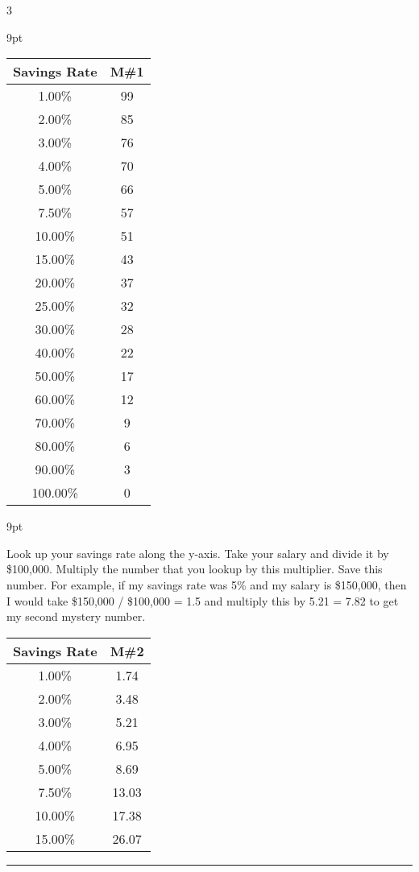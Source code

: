\documentclass[landscape]{article}
\newcommand{\myline}{\vspace{4pt}\hrule  \vspace{4pt}}
\newenvironment{topic}[1]{
	\noindent \textbf{\textsc{\color{harvardcrimson}{#1}}}
	\noindent \hspace{-3.5pt}
}{
	\myline
}
\newenvironment{tellme}[1]{
	\noindent \textbf{\textit{\color{harvardblue}{#1}}}
	\begin{adjustwidth}{9pt}{}
	}{
	\end{adjustwidth}
}
\begin{document}
\begin{multicols*}{3}
\begin{topic}{Numbers Game}
\begin{tellme}{Computing Mystery Number One}
			\begin{center}
				\begin{tabular}{cc}
					\toprule
					Savings Rate & M\#1\\
					\midrule
					1.00\% & 99\\ 
					2.00\% & 85\\ 
					3.00\% & 76\\ 
					4.00\% & 70\\ 
					5.00\% & 66\\ 
					7.50\% & 57\\ 
					10.00\% & 51\\ 
					15.00\% & 43\\ 
					20.00\% & 37\\ 
					25.00\% & 32\\ 
					30.00\% & 28\\ 
					40.00\% & 22\\ 
					50.00\% & 17\\ 
					60.00\% & 12\\ 
					70.00\% & 9\\ 
					80.00\% & 6\\ 
					90.00\% & 3\\ 
					100.00\% & 0\\ 
					\bottomrule
				\end{tabular}
			\end{center}
		\end{tellme}
		\begin{tellme}{Computing Mystery Number Two}
			Look up your savings rate along the y-axis. Take your salary and divide it by \$100,000. Multiply the number that you lookup by this multiplier. Save this number. For example, if my savings rate was 5\% and my salary is \$150,000, then I would take \$150,000 / \$100,000 = 1.5 and multiply this by 5.21 = 7.82 to get my second mystery number.
			\begin{center}
				\begin{tabular}{cc}
					\toprule
					Savings Rate & M\#2\\
					\midrule
					1.00\% & 1.74 \\ 
					2.00\% & 3.48 \\ 
					3.00\% & 5.21 \\ 
					4.00\% & 6.95 \\ 
					5.00\% & 8.69 \\ 
					7.50\% & 13.03 \\ 
					10.00\% & 17.38 \\ 
					15.00\% & 26.07 \\ 

\end{tabular}
\end{center}
\end{tellme}
\end{topic}
\end{multicols*}
\end{document}
